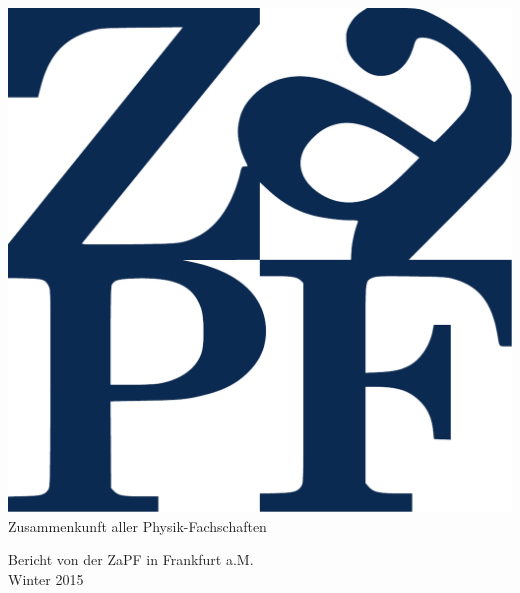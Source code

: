 \documentclass{scrartcl}
\begin{document}
\hspace{0.74\textwidth}
\begin{minipage}{0.25\textwidth}
      \vspace{-1cm}
      \centering
      \includegraphics[width=.89\textwidth]{logo.pdf}
      \small Zusammenkunft aller Physik-Fachschaften
\end{minipage}

\begin{center}
      \vspace{1.5cm}
      \huge{Bericht von der ZaPF in Frankfurt a.M. \\ Winter 2015}
      \vspace{1cm}
\end{center}


\end{document}
